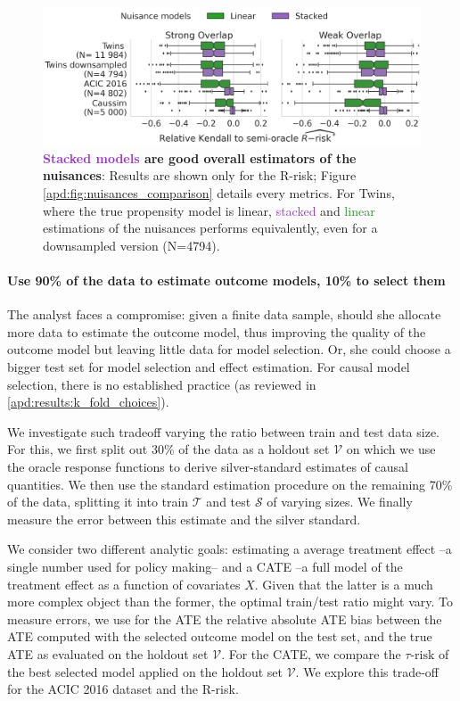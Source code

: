 \documentclass{report}
\begin{document}
\begin{figure}[!tb]
  \centering
  \includegraphics[width=0.8\linewidth]{img/chapter_5/_4_nuisance_models_r_risk_only_3datasets.png}
  \caption{\textbf{\textcolor{DarkOrchid}{Stacked
        models} are good overall estimators of the nuisances}:
    Results are shown only for the
    R-risk; Figure \ref{apd:fig:nuisances_comparison}
    details every metrics. For Twins, where the true propensity
    model is linear, \textcolor{DarkOrchid}{stacked} and
    \textcolor{ForestGreen}{linear}
    estimations of the nuisances performs equivalently, even for a downsampled version
    (N=4794). }\label{fig:all_datasets_nuisances_comparison}
\end{figure}

\paragraph{Use 90\% of the data to estimate outcome models, 10\% to
  select them}

The analyst faces a compromise: given a finite
data sample, should she allocate more data to estimate the outcome model,
thus improving the quality of the outcome model but leaving
little data for model selection. Or, she could choose a bigger test set for
model selection and effect estimation. For causal model selection, there
is no established practice (as reviewed in \ref{apd:results:k_fold_choices}).

We investigate such tradeoff varying the ratio between train and test
data size. For this, we first split out 30\% of the data as a holdout set
$\mathcal{V}$ on which we use the oracle response functions to derive
silver-standard estimates of causal quantities. We then
use the standard estimation procedure on the remaining 70\% of the data,
splitting it into train $\mathcal{T}$ and test $\mathcal{S}$ of varying
sizes. We finally measure the error between this estimate and the
silver standard.

We consider two different analytic goals: estimating a average
treatment effect --a single number used for policy making-- and a
CATE --a full model of the treatment effect as a function of covariates
$X$. Given that the latter is a much more complex object than the former,
the optimal train/test ratio might vary. To measure errors, we use for
the ATE the relative absolute ATE bias between the ATE computed with the
selected outcome model on the test set, and the true ATE as evaluated on
the holdout set $\mathcal{V}$. For the CATE, we compare the
$\tau\text{-risk}$
of the best selected model applied on the holdout set $\mathcal{V}$. We explore this trade-off for the ACIC 2016 dataset and the R-risk.
\end{document}
